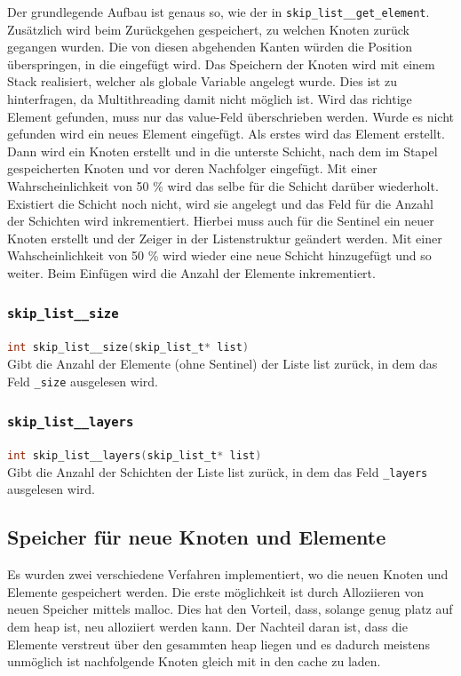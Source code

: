 \documentclass{TUBAFarbeiten}
\newcommand{\lstin}[1]{\lstinline[language=C]{#1}}
\begin{document}
Der grundlegende Aufbau ist genaus so, wie der in \lstin{skip_list__get_element}. Zusätzlich wird beim Zurückgehen gespeichert, zu welchen Knoten zurück gegangen wurden. Die von diesen abgehenden Kanten würden die Position überspringen, in die eingefügt wird. Das Speichern der Knoten wird mit einem Stack realisiert, welcher als globale Variable angelegt wurde. Dies ist zu hinterfragen, da Multithreading damit nicht möglich ist. Wird das richtige Element gefunden, muss nur das value-Feld überschrieben werden. Wurde es nicht gefunden wird ein neues Element eingefügt. Als erstes wird das Element erstellt. Dann wird ein Knoten erstellt und in die unterste Schicht, nach dem im Stapel gespeicherten Knoten und vor deren Nachfolger eingefügt. Mit einer Wahrscheinlichkeit von 50 \% wird das selbe für die Schicht darüber wiederholt. Existiert die Schicht noch nicht, wird sie angelegt und das Feld für die Anzahl der Schichten wird inkrementiert. Hierbei muss auch für die Sentinel ein neuer Knoten erstellt und der Zeiger in der Listenstruktur geändert werden. Mit einer Wahscheinlichkeit von 50 \% wird wieder eine neue Schicht hinzugefügt und so weiter. Beim Einfügen wird die Anzahl der Elemente inkrementiert.

\subsubsection{\lstin{skip_list__size}}

\lstin{int skip_list__size(skip_list_t* list)} \\

Gibt die Anzahl der Elemente (ohne Sentinel) der Liste list zurück, in dem das Feld \lstin{_size} ausgelesen wird.

\subsubsection{\lstin{skip_list__layers}}

\lstin{int skip_list__layers(skip_list_t* list)} \\

Gibt die Anzahl der Schichten der Liste list zurück, in dem das Feld \lstin{_layers} ausgelesen wird.

\subsection{Speicher für neue Knoten und Elemente}

Es wurden zwei verschiedene Verfahren implementiert, wo die neuen Knoten und Elemente gespeichert werden. Die erste möglichkeit ist durch Alloziieren von neuen Speicher mittels malloc. Dies hat den Vorteil, dass, solange genug platz auf dem heap ist, neu alloziiert werden kann. Der Nachteil daran ist, dass die Elemente verstreut über den gesammten heap liegen und es dadurch meistens unmöglich ist nachfolgende Knoten gleich mit in den cache zu laden.
\end{document}
